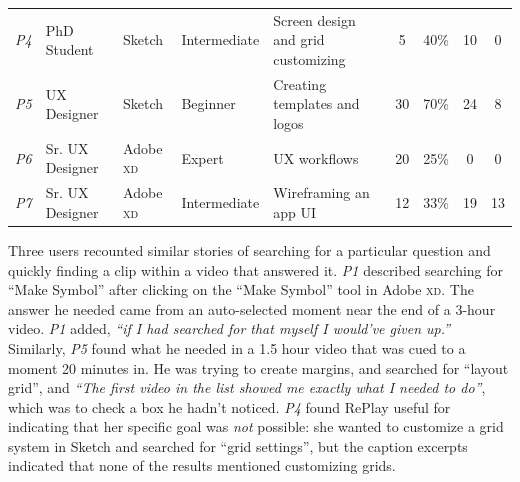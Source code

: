 \begin{table}[t]
{\begin{tabular}{lllllcccc}
\textit{P4}          & PhD Student              & Sketch                & Intermediate  & Screen design and grid customizing                                           & 5                                                                             & 40\%                                                                                            & 10                   & 0                                                                                         \\
\textit{P5}          & UX Designer              & Sketch                & Beginner      & Creating templates and logos                                                 & 30                                                                            & 70\%                                                                                           & 24                   & 8                                                                                         \\
\textit{P6}          & Sr. UX Designer       & Adobe \textsc{xd}     & Expert        & UX workflows                                                                 & 20                                                                            & 25\%                                                                                            & \phantom{0}0                    & 0                                                                                         \\
\textit{P7}          & Sr. UX Designer       & Adobe \textsc{xd}     & Intermediate  & Wireframing an app UI                                                        & 12                                                                            & 33\%                                                                                            & 19                   & 13\phantom{0}                                                                                       
\end{tabular}
}
\end{table}

Three users recounted similar stories of searching for a particular question and quickly finding a clip within a video that answered it. \textit{P1} described searching for ``Make Symbol'' after clicking on the ``Make Symbol'' tool in Adobe \textsc{xd}. The answer he needed came from an auto-selected moment near the end of a 3-hour video. \textit{P1} added, \textit{``if I had searched for that myself I would've given up.''} Similarly, \textit{P5} found what he needed in a 1.5 hour video that was cued to a moment 20 minutes in. He was trying to create margins, and searched for ``layout grid'', and \textit{``The first video in the list showed me exactly what I needed to do''}, which was to check a box he hadn't noticed. \textit{P4} found RePlay useful for indicating that her specific goal was \textit{not} possible: she wanted to customize a grid system in Sketch and searched for ``grid settings'', but the caption excerpts indicated that none of the results mentioned customizing grids.

